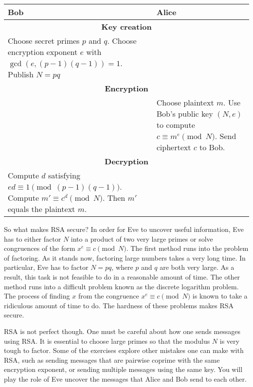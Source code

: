 \documentclass{article}
\begin{document}
    \begin{table}[h!]
        \centering
        \begin{tabular}{|p{5cm}|p{5cm}|}
            \hline
            \textbf{Bob} & \textbf{Alice}\\
            \hline\hline
            \multicolumn{2}{|c|}{\bf Key creation}\\
            \hline
            Choose secret primes \(p\) and \(q\).
            Choose encryption exponent \(e\) with \(\gcd(e,(p-1)(q-1))=1\).
            Publish \(N=pq\) &\\
            \hline
            \multicolumn{2}{|c|}{\bf Encryption}\\
            \hline
            & Choose plaintext \(m\).
            Use Bob's public key \((N,e)\) to compute \(c\equiv m^e\pmod{N}\).
            Send ciphertext \(c\) to Bob.\\
            \hline
            \multicolumn{2}{|c|}{\bf Decryption}\\
            \hline
            Compute \(d\) satisfying \(ed\equiv 1\pmod{(p-1)(q-1)}\).
            Compute \(m' \equiv c^d\pmod{N}\).
            Then \(m'\) equals the plaintext \(m\).&\\
            \hline
        \end{tabular}
    \end{table}

    So what makes RSA secure?
    In order for Eve to uncover useful information, Eve has to either factor \(N\) into a product of two very large primes or solve congruences of the form \(x^e\equiv c\pmod{N}\).
    The first method runs into the problem of factoring.
    As it stands now, factoring large numbers takes a very long time.
    In particular, Eve has to factor \(N=pq\), where \(p\) and \(q\) are both very large.
    As a result, this task is not feasible to do in a reasonable amount of time.
    The other method runs into a difficult problem known as the discrete logarithm problem.
    The process of finding \(x\) from the congruence \(x^e\equiv c\pmod{N}\) is known to take a ridiculous amount of time to do.
    The hardness of these problems makes RSA secure.

    RSA is not perfect though.
    One must be careful about how one sends messages using RSA.
    It is essential to choose large primes so that the modulus \(N\) is very tough to factor.
    Some of the exercises explore other mistakes one can make with RSA, such as sending messages that are pairwise coprime with the same encryption exponent, or sending multiple messages using the same key.
    You will play the role of Eve uncover the messages that Alice and Bob send to each other.
\end{document}
